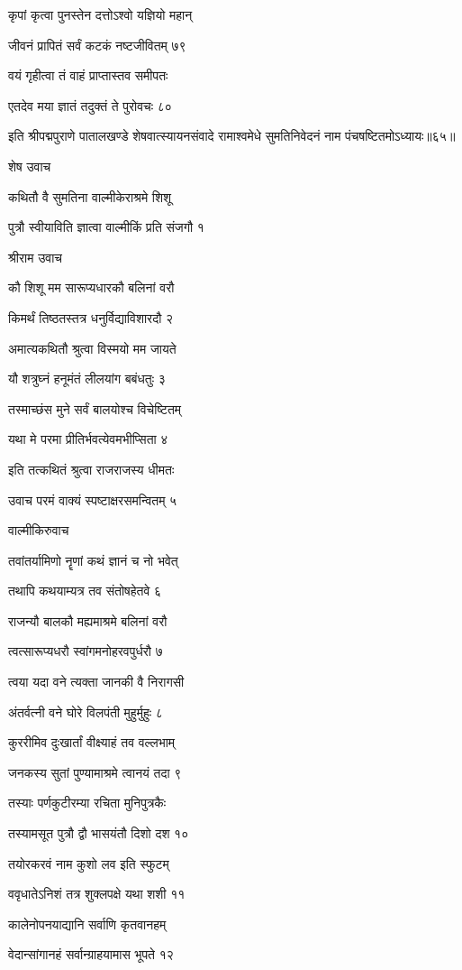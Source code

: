 कृपां कृत्वा पुनस्तेन दत्तोऽश्वो यज्ञियो महान्

जीवनं प्रापितं सर्वं कटकं नष्टजीवितम् ७९

वयं गृहीत्वा तं वाहं प्राप्तास्तव समीपतः

एतदेव मया ज्ञातं तदुक्तं ते पुरोवचः ८०

इति श्रीपद्मपुराणे पातालखण्डे शेषवात्स्यायनसंवादे रामाश्वमेधे सुमतिनिवेदनं नाम पंचषष्टितमोऽध्यायः॥६५॥


शेष उवाच

कथितौ वै सुमतिना वाल्मीकेराश्रमे शिशू

पुत्रौ स्वीयाविति ज्ञात्वा वाल्मीकिं प्रति संजगौ १

श्रीराम उवाच

कौ शिशू मम सारूप्यधारकौ बलिनां वरौ

किमर्थं तिष्ठतस्तत्र धनुर्विद्याविशारदौ २

अमात्यकथितौ श्रुत्वा विस्मयो मम जायते

यौ शत्रुघ्नं हनूमंतं लीलयांग बबंधतुः ३

तस्माच्छंस मुने सर्वं बालयोश्च विचेष्टितम्

यथा मे परमा प्रीतिर्भवत्येवमभीप्सिता ४

इति तत्कथितं श्रुत्वा राजराजस्य धीमतः

उवाच परमं वाक्यं स्पष्टाक्षरसमन्वितम् ५

वाल्मीकिरुवाच

तवांतर्यामिणो नॄणां कथं ज्ञानं च नो भवेत्

तथापि कथयाम्यत्र तव संतोषहेतवे ६

राजन्यौ बालकौ मह्यमाश्रमे बलिनां वरौ

त्वत्सारूप्यधरौ स्वांगमनोहरवपुर्धरौ ७

त्वया यदा वने त्यक्ता जानकी वै निरागसी

अंतर्वत्नी वने घोरे विलपंती मुहुर्मुहुः ८

कुररीमिव दुःखार्तां वीक्ष्याहं तव वल्लभाम्

जनकस्य सुतां पुण्यामाश्रमे त्वानयं तदा ९

तस्याः पर्णकुटीरम्या रचिता मुनिपुत्रकैः

तस्यामसूत पुत्रौ द्वौ भासयंतौ दिशो दश १०

तयोरकरवं नाम कुशो लव इति स्फुटम्

ववृधातेऽनिशं तत्र शुक्लपक्षे यथा शशी ११

कालेनोपनयाद्यानि सर्वाणि कृतवानहम्

वेदान्सांगानहं सर्वान्ग्राहयामास भूपते १२


